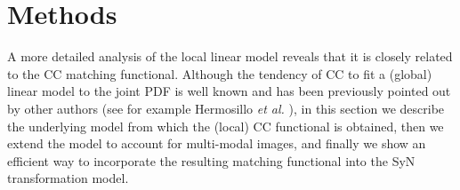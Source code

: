 \vspace{-0.5cm}
\section{Methods}\label{sec:methods}
A more detailed analysis of the local linear model reveals that it is closely related to the CC matching functional. Although the tendency of CC to fit a (global) linear model to the joint PDF is well known and has been previously pointed out by other authors (see for example Hermosillo {\it et al.} \cite{Hermosillo2004}), in this section we describe the underlying model from which the (local) CC functional is obtained, then we extend the model to account for multi-modal images, and finally we show an efficient way to incorporate the resulting matching functional into the SyN transformation model.

